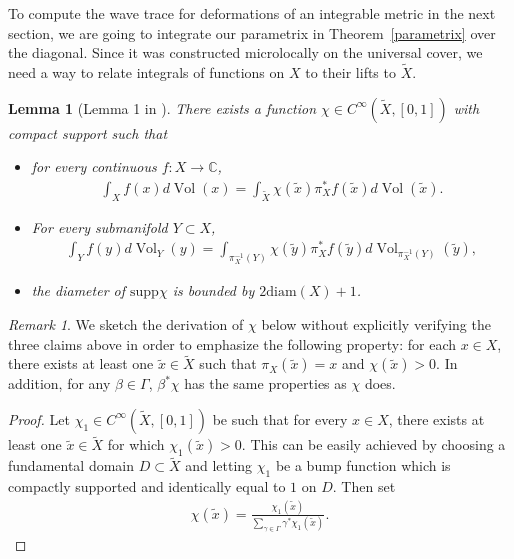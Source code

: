 \documentclass[11pt,letterpaper,oneside]{amsart}
\newcommand{\C}{\mathbb{C}}
\newcommand{\supp}{\text{supp}}
\newtheorem{lemm}[theo]{Lemma}
\theoremstyle{definition}
\theoremstyle{remark}
\newtheorem{rema}[theo]{Remark}
\newcommand{\wt}{\widetilde}
\newcommand{\vol}{{\operatorname{Vol}}}
\theoremstyle{definition}
\theoremstyle{remark}
\begin{document}
To compute the wave trace for deformations of an integrable metric in the next section, we are going to integrate our parametrix in Theorem~\ref{parametrix} over the diagonal. Since it was constructed microlocally on the universal cover, we need a way to relate integrals of functions on $X$ to their lifts to $\wt X$.

\begin{lemm}[Lemma 1 in \cite{CdVsllgp1}] \label{CdVlemma}
    There exists a function $\chi \in C^\infty(\wt X, [0,1])$ with compact support such that
    \begin{itemize}
        \item for every continuous $f: X \to \C$,
        \begin{align*}
            \int_X f(x) d \vol (x) = \int_{\wt X} \chi(\wt x) \pi_X^*f(\wt x) d \vol (\wt x).
        \end{align*}
        \item For every submanifold $Y \subset X$,
        \begin{align*}
             \int_Y f(y) d \vol_Y(y) = \int_{\pi_X^{-1}(Y)} \chi( \wt y) \pi_X^*f( \wt y) d \vol_{\pi_X^{-1}(Y)}( \wt y),
        \end{align*}
        \item the diameter of $\supp \chi$ is bounded by $2 \text{diam}(X) + 1$.
    \end{itemize}
\end{lemm}
 
\begin{rema}\label{positivity of chi CdV}
    We sketch the derivation of $\chi$ below without explicitly verifying the three claims above in order to emphasize the following property: for each $x \in X$, there exists at least one $\wt x \in \wt X$ such that $\pi_X(\wt x) = x$ and $\chi (\wt x) > 0$. In addition, for any $\beta \in \Gamma$, $\beta^* \chi$ has the same properties as $\chi$ does.
\end{rema}
\begin{proof}
    Let $\chi_1 \in C^\infty(\wt X, [0,1])$ be such that for every $x \in X$, there exists at least one $\wt{x} \in \wt{X}$ for which $\chi_1(\wt{x}) > 0$. This can be easily achieved by choosing a fundamental domain $D \subset \wt X$ and letting $\chi_1$ be a bump function which is compactly supported and identically equal to $1$ on $D$. Then set
    \begin{align}
        \chi(\wt{x}) = \frac{\chi_1(\wt{x})}{\sum_{\gamma \in \Gamma} \gamma^* \chi_1(\wt{x})}.
    \end{align}
\end{proof}
\end{document}
